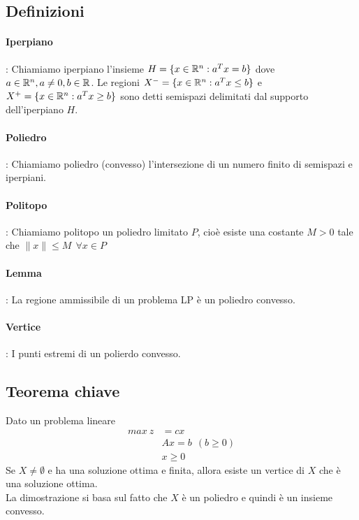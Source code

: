 \documentclass[12pt,a4paper]{article}
\begin{document}
\subsection{Definizioni}
\paragraph{Iperpiano}: Chiamiamo iperpiano l'insieme $H=\{x\in\mathbb{R}^n:a^Tx=b\}$ dove $a\in \mathbb{R}^n, a\not = 0, b\in \mathbb{R}$. Le regioni $X^- =\{x\in \mathbb{R}^n:a^Tx \leq b\}$ e $X^+=\{x\in \mathbb{R}^n:a^Tx \geq b\}$ sono detti semispazi delimitati dal supporto dell'iperpiano $H$.

\paragraph{Poliedro}: Chiamiamo poliedro (convesso) l'intersezione di un numero finito di semispazi e iperpiani.

\paragraph{Politopo}: Chiamiamo politopo un poliedro limitato $P$, cioè esiste una costante $M>0$ tale che $\|x\| \leq M \ \ \forall x \in P$

\paragraph{Lemma}: La regione ammissibile di un problema LP è un poliedro convesso.

\paragraph{Vertice}: I punti estremi di un polierdo convesso.

\subsection{Teorema chiave}
Dato un problema lineare $$\begin{array}{rl}
max\ z & = cx\\
& Ax = b \ \ (b\geq 0)\\
& x \geq 0
\end{array}$$
Se $X\not = \emptyset$ e ha una soluzione ottima e finita, allora esiste un vertice di $X$ che è una soluzione ottima.\\
La dimostrazione si basa sul fatto che $X$ è un poliedro e quindi è un insieme convesso.

\clearpage
\end{document}
